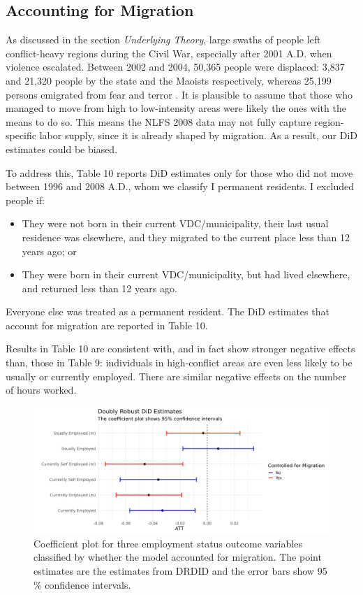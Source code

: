 \documentclass[12pt,a4paper]{article}
\begin{document}
\subsection{Accounting for Migration}
As discussed in the section \textit{Underlying Theory}, large swaths of people left conflict-heavy regions during the Civil War\parencite{insec2008}, especially after 2001 A.D. when violence escalated. Between 2002 and 2004, 50,365 people were displaced: 3,837 and 21,320 people by the state and the Maoists respectively, whereas 25,199 persons emigrated from fear and terror \parencite{lawoti2010maoist}. It is plausible to assume that those who managed to move from high to low-intensity areas were likely the ones with the means to do so. This means the NLFS 2008 data may not fully capture region-specific labor supply, since it is already shaped by migration. As a result, our DiD estimates could be biased.

To address this, Table 10 reports DiD estimates only for those who did not move between 1996 and 2008 A.D., whom we classify I permanent residents. I excluded people if:

\begin{itemize}
	\item They were not born in their current VDC/municipality, their last usual residence was elsewhere, and they migrated to the current place less than 12 years ago; or
	\item They were born in their current VDC/municipality, but had lived elsewhere, and returned less than 12 years ago.
\end{itemize}

Everyone else was treated as a permanent resident. The DiD estimates that account for migration are reported in Table 10.



Results in Table 10 are consistent with, and in fact show stronger negative effects than, those in Table 9: individuals in high-conflict areas are even less likely to be usually or currently employed. There are similar negative effects on the number of hours worked.
\begin{figure}[H]
	\centering
	\includegraphics[width=1\textwidth]{../Analysis files/coefplot_1.jpg}
	\caption{Coefficient plot for three employment status outcome variables classified by whether the model accounted for migration. The point estimates are the estimates from DRDID and the error bars show 95 \% confidence intervals.}
	\label{fig:coefplot_1_1}
\end{figure}
\end{document}
